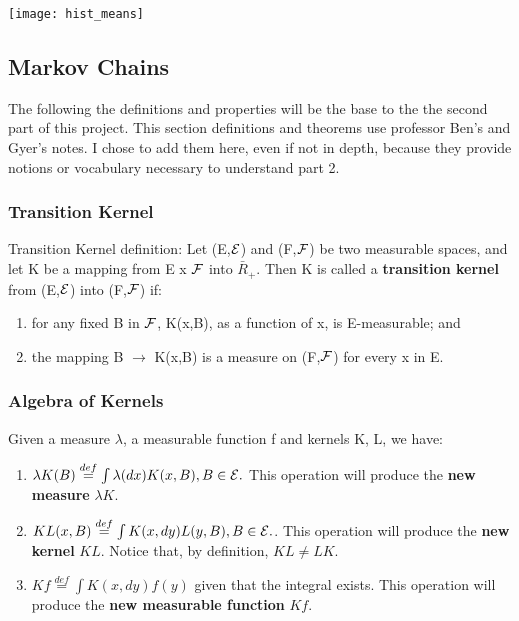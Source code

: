 \newpage

\texttt{[image: hist\_means]}


\subsection{Markov Chains}

The following the definitions and properties will be the base to the the second part of this project. This section definitions and theorems use professor Ben's and Gyer's notes. I chose to add them here, even if not in depth, because they provide notions or vocabulary necessary to understand part 2.

\subsubsection{Transition Kernel}\label{kernel_section}

Transition Kernel definition: Let (E,$\mathcal{E}$) and (F,$\mathcal{F}$) be two measurable spaces, and let K be a mapping from E x $\mathcal{F}$ into $\bar{R}_+$. Then K is called a\textbf{ transition kernel} from (E,$\mathcal{E}$) into (F,$\mathcal{F}$) if:

\begin{enumerate}[label=\alph*)]
\item for any fixed B in $\mathcal{F}$, K(x,B), as a function of x, is E-measurable; and

\item\label{prob_meas} the mapping B $\rightarrow$ K(x,B) is a measure on (F,$\mathcal{F}$) for every x in E.
\end{enumerate}



\subsubsection{Algebra of Kernels}\label{alg_kernels}
Given a measure $\lambda$, a measurable function f and kernels K, L, we have:

\begin{enumerate}[label=\alph*)]
\item$ \lambda K (B)  \overset{def}{=} \int \lambda(dx)K(x, B), B \in \mathcal{E}.$ This operation will produce the \textbf{new measure} $\lambda K$.

\item$KL(x, B) \overset{def}{=} \int K(x, dy)L(y, B), B \in \mathcal{E}.$. This operation will produce the \textbf{new kernel} $KL$. Notice that, by definition, $KL \neq LK$.
 
\item$Kf \overset{def}{=} \int K(x, dy)f(y)$ given that the integral exists. This operation will produce the \textbf{new measurable function} $Kf$. 

\end{enumerate}



